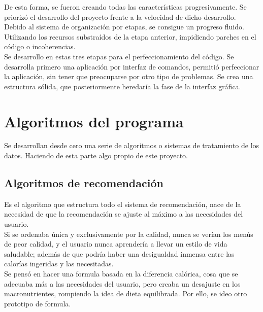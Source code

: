 De esta forma, se fueron creando todas las características progresivamente. Se priorizó el desarrollo del proyecto frente a la velocidad de dicho desarrollo. Debido al sistema de organización por etapas, se consigue un progreso fluido. Utilizando los recursos substraídos de la etapa anterior, impidiendo parches en el código o incoherencias.\\

Se desarrollo en estas tres etapas para el perfeccionamiento del código. Se desarrolla primero una aplicación por interfaz de comandos, permitió perfeccionar la aplicación, sin tener que preocuparse por otro tipo de problemas. Se crea una estructura sólida, que posteriormente heredaría la fase de la interfaz gráfica.\\

\section{Algoritmos del programa}
Se desarrollan desde cero una serie de algoritmos o sistemas de tratamiento de los datos. Haciendo de esta parte algo propio de este proyecto.
\subsection{Algoritmos de recomendación}
Es el algoritmo que estructura todo el sistema de recomendación, nace de la necesidad de que la recomendación se ajuste al máximo a las necesidades del usuario.\\
Si se ordenaba única y exclusivamente por la calidad, nunca se verían los menús de peor calidad, y el usuario nunca aprendería a llevar un estilo de vida saludable; además de que podría haber una desigualdad inmensa entre las calorías ingeridas y las necesitadas.\\
Se pensó en hacer una formula basada en la diferencia calórica, cosa que se adecuaba más a las necesidades del usuario, pero creaba un desajuste en los macronutrientes, rompiendo la idea de dieta equilibrada. Por ello, se ideo otro prototipo de formula.\\

